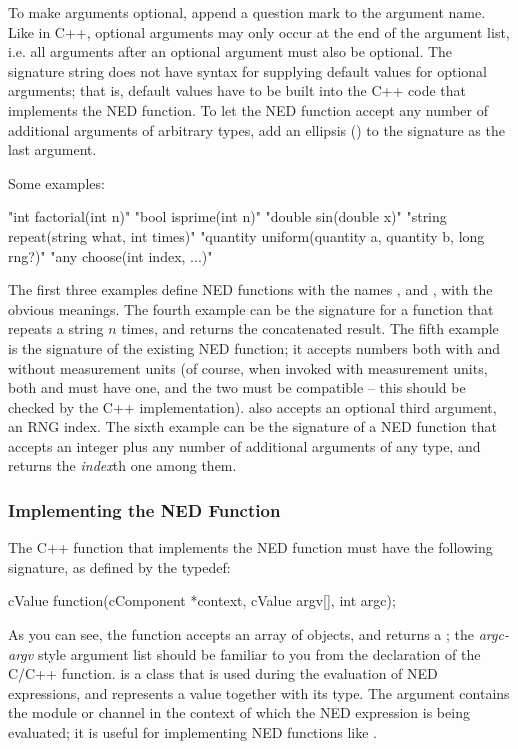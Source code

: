 To make arguments optional, append a question mark to the argument name.
Like in C++, optional arguments may only occur at the end of the argument
list, i.e. all arguments after an optional argument must also be optional.
The signature string does not have syntax for supplying default values for
optional arguments; that is, default values have to be built into the C++
code that implements the NED function. To let the NED function accept any
number of additional arguments of arbitrary types, add an ellipsis
() to the signature as the last argument.

Some examples:

\begin{cpp}
"int factorial(int n)"
"bool isprime(int n)"
"double sin(double x)"
"string repeat(string what, int times)"
"quantity uniform(quantity a, quantity b, long rng?)"
"any choose(int index, ...)"
\end{cpp}

The first three examples define NED functions with the names ,
 and , with the obvious meanings. The fourth example
can be the signature for a function that repeats a string $n$ times, and
returns the concatenated result. The fifth example is the signature of the
existing  NED function; it accepts numbers both with and without
measurement units (of course, when invoked with measurement units, both 
and  must have one, and the two must be compatible -- this should be checked
by the C++ implementation).  also accepts an optional third argument,
an RNG index. The sixth example can be the signature of a 
NED function that accepts an integer plus any number of additional arguments
of any type, and returns the \textit{index}th one among them.

\subsubsection{Implementing the NED Function}
\label{sec:sim-lib:implementing-ned-function}

The C++ function that implements the NED function must have the following
signature, as defined by the  typedef:

\begin{cpp}
cValue function(cComponent *context, cValue argv[], int argc);
\end{cpp}

As you can see, the function accepts an array of 
objects, and returns a ; the \textit{argc-argv} style
argument list should be familiar to you from the declaration of the C/C++
 function.  is a class that is used during
the evaluation of NED expressions, and represents a value together with its
type.  The  argument contains the module or channel in the
context of which the NED expression is being evaluated; it is useful for
implementing NED functions like .

